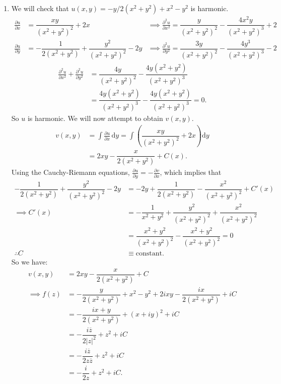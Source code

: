 \documentclass{article}
\newcommand{\party}[2] {\frac{\partial #1}{\partial #2}}
\newcommand{\partyy}[2] {\frac{\partial^2 #1}{\partial {#2}^2}}
\begin{document}
\begin{enumerate}
\begin{enumerate}
\item
We will check that $u(x,y) = -y/2(x^2 + y^2) + x^2 - y^2 $ is harmonic.
\begin{align*}
\party{u}{x} &= \dfrac{xy}{(x^2 + y^2)^2} + 2x &\implies \partyy{u}{x} = \dfrac{y}{(x^2 + y^2)^2} - \dfrac{4x^2 y}{(x^2 + y^2)^3} + 2 \\
\party{u}{y} &= -\dfrac{1}{2(x^2 + y^2)} + \dfrac{y^2}{(x^2 + y^2)^2} - 2y &\implies \partyy{u}{y} = \dfrac{3y}{(x^2 + y^2)^2} - \dfrac{4y^3}{(x^2 + y^2)^3} - 2
\end{align*}
\begin{align*}
\partyy{u}{x} + \partyy{u}{y} &= \dfrac{4y}{(x^2 + y^2)^2} - \dfrac{4y(x^2 + y^2)}{(x^2 + y^2)^3} \\
 &= \dfrac{4y(x^2 + y^2)}{(x^2 + y^2)^3} - \dfrac{4y(x^2 + y^2)}{(x^2 + y^2)^3} = 0.
\end{align*}
So $u$ is harmonic. We will now attempt to obtain $v(x,y)$.
\begin{align*}
v(x,y) &=  \int \party{u}{x} \,\text{d}y = \int \left( \dfrac{xy}{(x^2 + y^2)^2} + 2x \right) \text{d}y \\ &= 2xy - \dfrac{x}{2(x^2 + y^2)} + C(x).
\end{align*}
Using the Cauchy-Riemann equations, $\party{u}{y} = -\party{v}{x}$, which implies that
\begin{align*}
 -\dfrac{1}{2(x^2 + y^2)} + \dfrac{y^2}{(x^2 + y^2)^2} - 2y &= -2y + \dfrac{1}{2(x^2 + y^2)} - \dfrac{x^2}{(x^2 + y^2)^2} + C'(x) \\
\implies C'(x) &= -\dfrac{1}{x^2 + y^2} + \dfrac{y^2}{(x^2 + y^2)^2} + \dfrac{x^2}{(x^2 + y^2)^2} \\
&= \dfrac{x^2 + y^2}{(x^2 + y^2)^2} -  \dfrac{x^2 + y^2}{(x^2 + y^2)^2} = 0 \\ \therefore C &\equiv \text{constant}. 
\end{align*}
So we have:
\begin{align*}
v(x,y) &=  2xy - \dfrac{x}{2(x^2 + y^2)} + C \\
\implies f(z) &= -\dfrac{y}{2(x^2 + y^2)} + x^2 - y^2 + 2ixy - \dfrac{ix}{2(x^2 + y^2)} + iC \\
&= -\dfrac{ix + y}{2(x^2 + y^2)} + (x + iy)^2 + iC \\
&= -\dfrac{i\overline{z}}{2|z|^2} + z^2 + iC \\
&= -\dfrac{i\overline{z}}{2z \overline{z}} + z^2 + iC \\
&= -\dfrac{i}{2z} + z^2 + iC.
\end{align*}


\end{enumerate}
\end{enumerate}
\end{document}
